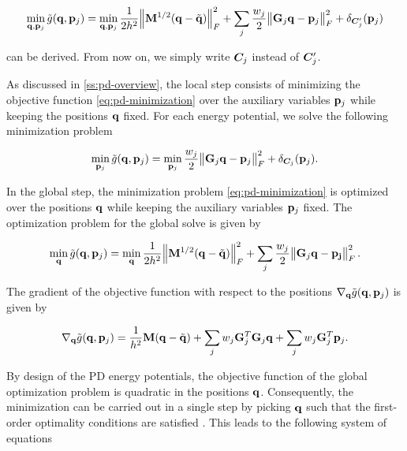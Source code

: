 \begin{equation}\label{eq:pd-minimization}
    \min_{\mathbf{q}, \mathbf{p}_j} \tilde{g}(\mathbf{q}, \mathbf{p}_j) = 
    \min_{\mathbf{q}, \mathbf{p}_j} \frac{1}{2h^2} \norm{\mathbf{M}^{1/2}(\mathbf{q} - \tilde{\mathbf{q}})}^2_F + \sum_j \frac{w_j}{2} \norm{\mathbf{G}_j\mathbf{q}
    - \mathbf{p}_j}^2_F + \delta_{\bm{C}^\prime_j}(\mathbf{p}_j)
\end{equation}

\noindent can be derived. From now on, we simply write $\bm{C}_j$ instead of $\bm{C}^\prime_j$.

As discussed in \cref{ss:pd-overview}, the local step consists of minimizing the objective function 
\autoref{eq:pd-minimization} over the auxiliary variables $\mathbf{p}_j$ while keeping the positions $\mathbf{q}$ fixed. For each 
energy potential, we solve the following minimization problem

\begin{equation}\label{eq:pd-local-minimization}
    \min_{\mathbf{p}_j} \tilde{g}(\mathbf{q}, \mathbf{p}_j) =
    \min_{\mathbf{p}_j} \frac{w_j}{2}\norm{\mathbf{G}_j\mathbf{q} - \mathbf{p}_j}^2_F + \delta_{\bm{C}_j}(\mathbf{p}_j).
\end{equation}

\noindent In the global step, the minimization problem \autoref{eq:pd-minimization} is optimized over the positions $\mathbf{q}$ 
while keeping the auxiliary variables $\mathbf{p}_j$ fixed. The optimization problem for the global solve is 
given by

\begin{equation}\label{eq:pd-global-minimization}
    \min_{\mathbf{q}} \tilde{g}(\mathbf{q}, \mathbf{p}_j) =
    \min_{\mathbf{q}} \frac{1}{2h^2} \norm{\mathbf{M}^{1/2}(\mathbf{q} - \tilde{\mathbf{q}})}^2_F + \sum_j \frac{w_j}{2} \norm{\mathbf{G}_j\mathbf{q} - \mathbf{p_j}}^2_F.
\end{equation}

\noindent The gradient of the objective function with respect to the positions $\nabla_{\mathbf{q}} 
\tilde{g}(\mathbf{q}, \mathbf{p}_j)$ is given by 

\begin{equation}\label{eq:pd-gradient-q}
    \nabla_{\mathbf{q}}\tilde{g}(\mathbf{q}, \mathbf{p}_j) = \frac{1}{h^2}\mathbf{M}(\mathbf{q} - \tilde{\mathbf{q}}) + \sum_j w_j \mathbf{G}^T_j \mathbf{G}_j \mathbf{q}
    + \sum_j w_j \mathbf{G}^T_j \mathbf{p}_j.
\end{equation}

\noindent By design of the PD energy potentials, the objective function of the global optimization problem is quadratic in the positions 
$\mathbf{q}$. Consequently, the minimization can be carried out in a single step by picking $\mathbf{q}$ such that the first-order optimality 
conditions are satisfied \cite{nocedal2006}. This leads to the following system of equations

